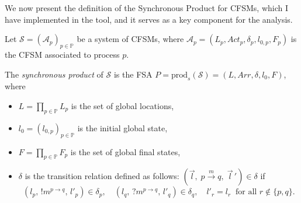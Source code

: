 We now present the definition of the
Synchronous Product for CFSMs, which I have implemented in the
tool, and it serves as a key component for the analysis.

\bigskip

\begin{definition}\label{def:syncprod}
Let $\mathcal{S} = (\mathcal{A}_p)_{p \in \mathbb{P}}$ be a system of CFSMs, where 
$\mathcal{A}_p = (L_p, \mathit{Act}_p, \delta_p, l_{0,p}, F_p)$ is the CFSM associated 
to process $p$.  

The \emph{synchronous product} of $\mathcal{S}$ is the FSA 
$P = \mathrm{prod}_s(\mathcal{S}) = (L, \mathit{Arr}, \delta, l_0, F)$,
where
\begin{itemize}
    \item $L = \prod_{p \in \mathbb{P}} L_p$ is the set of global locations,
    \item $l_0 = (l_{0,p})_{p \in \mathbb{P}}$ is the initial global state,
    \item $F = \prod_{p \in \mathbb{P}} F_p$ is the set of global final states,
    \item $\delta$ is the transition relation defined as follows:  
    $(\vec{l}, \; p \xrightarrow{m} q, \; \vec{l}\,') \in \delta$ if
    \[
    (l_p,\, !m^{p \to q},\, l'_p) \in \delta_p, \quad 
    (l_q,\, ?m^{p \to q},\, l'_q) \in \delta_q, \quad 
    l'_r = l_r \;\; \text{for all } r \notin \{p,q\}.
    \]
\end{itemize}
\end{definition}

\bigskip

